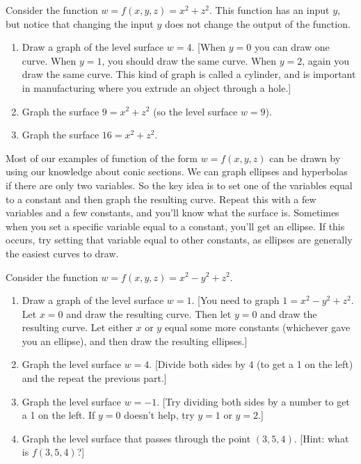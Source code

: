 \begin{problem}
%
%
Consider the function $w=f(x,y,z)=x^2+z^2$. This function has an input $y$, but notice that changing the input $y$ does not change the output of the function.
 \begin{enumerate}
  \item Draw a graph of the level surface $w=4$. [When $y=0$ you can draw one curve.  When $y=1$, you should draw the same curve.  When $y=2$, again you draw the same curve.  This kind of graph is called a cylinder, and is important in manufacturing where you extrude an object through a hole.]
  \item Graph the surface $9=x^2+z^2$ (so the level surface $w=9$).
  \item Graph the surface $16=x^2+z^2$.
 \end{enumerate}
\end{problem}

Most of our examples of function of the form $w=f(x,y,z)$ can be drawn by using our knowledge about conic sections. We can graph ellipses and hyperbolas if there are only two variables. So the key idea is to set one of the variables equal to a constant and then graph the resulting curve.  Repeat this with a few variables and a few constants, and you'll know what the surface is. Sometimes when you set a specific variable equal to a constant, you'll get an ellipse. If this occurs, try setting that variable equal to other constants, as ellipses are generally the easiest curves to draw.

\begin{problem}%
%
 Consider the function $w=f(x,y,z)=x^2-y^2+z^2$.
 \begin{enumerate}
  \item Draw a graph of the level surface $w=1$. [You need to graph $1=x^2-y^2+z^2$. Let $x=0$ and draw the resulting curve. Then let $y=0$ and draw the resulting curve. Let either $x$ or $y$ equal some more constants (whichever gave you an ellipse), and then draw the resulting ellipses.]  
  \item Graph the level surface $w=4$. [Divide both sides by $4$ (to get a 1 on the left) and the repeat the previous part.]
  \item Graph the level surface $w=-1$. [Try dividing both sides by a number to get a 1 on the left. If $y=0$ doesn't help, try $y=1$ or $y=2$.]
  \item Graph the level surface that passes through the point $(3,5,4)$. [Hint: what is $f(3,5,4)$?]
 \end{enumerate}
\end{problem}

